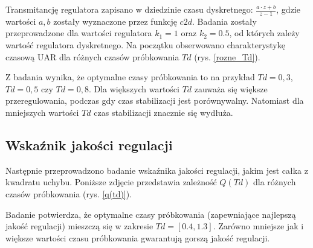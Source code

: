 \documentclass[12pt]{article}
\begin{document}

Transmitancję regulatora zapisano w dziedzinie czasu dyskretnego: $ \frac{a \cdot z +b}{z-1}$, gdzie wartości $a, b$ zostały wyznaczone przez funkcję $c2d$. Badania zostały przeprowadzone dla wartości regulatora $k_1 = 1$ oraz $k_2 = 0.5$, od których zależy wartość regulatora dyskretnego. Na początku obserwowano charakterystykę czasową UAR dla różnych czasów próbkowania $Td$ (rys. \ref{rozne_Td}).


Z badania wynika, że optymalne czasy próbkowania to na przykład $Td = 0,3$, $Td = 0,5$ czy $Td= 0,8$. Dla większych wartości $Td$ zauważa się większe przeregulowania, podczas gdy czas stabilizacji jest porównywalny. Natomiast dla mniejszych wartości $Td$ czas stabilizacji znacznie się wydłuża.

\subsection{Wskaźnik jakości regulacji}
Następnie przeprowadzono badanie wskaźnika jakości regulacji, jakim jest całka z kwadratu uchybu. Poniższe zdjęcie przedstawia zależność $Q(Td)$ dla różnych czasów próbkowania (rys. \ref{q(td)}).



Badanie potwierdza, że optymalne czasy próbkowania (zapewniające najlepszą jakość regulacji) mieszczą się w zakresie $Td = [0.4, 1.3]$. Zarówno mniejsze jak i większe wartości czasu próbkowania gwarantują gorszą jakość regulacji.
\end{document}
